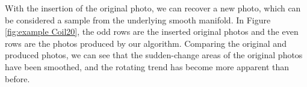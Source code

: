 \documentclass{article}
\theoremstyle{remark}
\begin{document}
With the insertion of the original photo, we can recover a new photo, which can be considered a sample from the underlying smooth manifold. In Figure \ref{fig:example Coil20}, the odd rows are the inserted original photos and the even rows are the photos produced by our algorithm. Comparing the original and produced photos, we can see that the sudden-change areas of the original photos have been smoothed, and the rotating trend has become more apparent than before.


\nocite{langley00}





%
%
%
\end{document}
